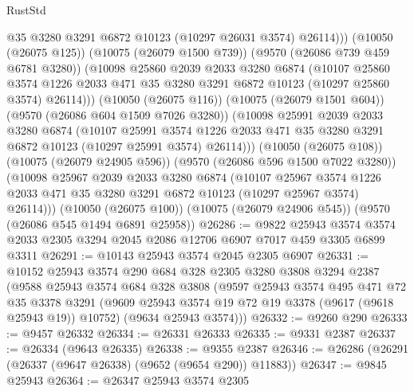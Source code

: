\begin{lexlean}{RustStd}
\begin{coremodule}
                @35
                @3280
                @3291
                @6872
                @10123
                (@10297 @26031 @3574)
                @26114)))
          (@10050 (@26075 @125))
          (@10075 (@26079 @1500 @739))
          (@9570 (@26086 @739 @459 @6781 @3280))
          (@10098
            @25860
            @2039
            @2033
            @3280
            @6874
            (@10107
              @25860
              @3574
              @1226
              @2033
              @471
              @35
              @3280
              @3291
              @6872
              @10123
              (@10297 @25860 @3574)
              @26114)))
        (@10050 (@26075 @116))
        (@10075 (@26079 @1501 @604))
        (@9570 (@26086 @604 @1509 @7026 @3280))
        (@10098
          @25991
          @2039
          @2033
          @3280
          @6874
          (@10107
            @25991
            @3574
            @1226
            @2033
            @471
            @35
            @3280
            @3291
            @6872
            @10123
            (@10297 @25991 @3574)
            @26114)))
      (@10050 (@26075 @108))
      (@10075 (@26079 @24905 @596))
      (@9570 (@26086 @596 @1500 @7022 @3280))
      (@10098
        @25967
        @2039
        @2033
        @3280
        @6874
        (@10107
          @25967
          @3574
          @1226
          @2033
          @471
          @35
          @3280
          @3291
          @6872
          @10123
          (@10297 @25967 @3574)
          @26114)))
    (@10050 (@26075 @100))
    (@10075 (@26079 @24906 @545))
    (@9570 (@26086 @545 @1494 @6891 @25958))
@26286 := @9822
    @25943
    @3574
    @3574
    @2033
    @2305
    @3294
    @2045
    @2086
    @12706
    @6907
    @7017
    @459
    @3305
    @6899
    @3311
@26291 := @10143 @25943 @3574 @2045 @2305 @6907
@26331 := @10152
    @25943
    @3574
    @290
    @684
    @328
    @2305
    @3280
    @3808
    @3294
    @2387
    (@9588
      @25943
      @3574
      @684
      @328
      @3808
      (@9597
        @25943
        @3574
        @495
        @471
        @72
        @35
        @3378
        @3291
        (@9609 @25943 @3574 @19 @72 @19 @3378 (@9617 (@9618 @25943 @19)) @10752)
        (@9634 @25943 @3574)))
@26332 := @9260 @290
@26333 := @9457 @26332
@26334 := @26331 @26333
@26335 := @9331 @2387
@26337 := @26334 (@9643 @26335)
@26338 := @9355 @2387
@26346 := @26286 (@26291 (@26337 (@9647 @26338) (@9652 (@9654 @290)) @11883))
@26347 := @9845 @25943
@26364 := @26347
    @25943
    @3574
    @2305

\end{coremodule}
\end{lexlean}
